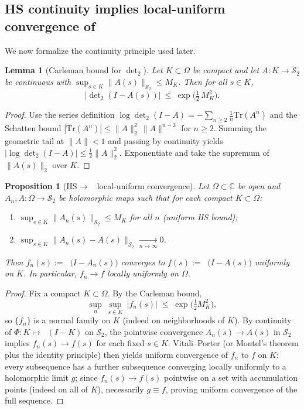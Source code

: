 \documentclass[11pt]{article}
\newtheorem{proposition}[theorem]{Proposition}
\newtheorem{lemma}[theorem]{Lemma}
\theoremstyle{definition}
\theoremstyle{remark}
\newcommand{\C}{\mathbb{C}}
\newcommand{\HS}{\mathcal{S}_2}
\DeclareMathOperator{\dettwo}{det_2}
\begin{document}
\subsection{HS continuity implies local-uniform convergence of \(\dettwo\)}\label{prop:hs-det2-continuity}
We now formalize the continuity principle used later.
\begin{lemma}[Carleman bound for \(\det_2\)]\label{lem:carleman}
Let \(K\subset\Omega\) be compact and let \(A:K\to \HS\) be continuous with \(\sup_{s\in K}\|A(s)\|_{\HS}\le M_K\). Then for all \(s\in K\),
\[
  \big|\det\nolimits_2(I-A(s))\big|\ \le\ \exp\!\Big(\tfrac12\,M_K^2\Big).
\]
\end{lemma}
\begin{proof}
Use the series definition \(\log\det_2(I-A)=-\sum_{n\ge2}\tfrac1n\mathrm{Tr}(A^n)\) and the Schatten bound \(|\mathrm{Tr}(A^n)|\le \|A\|_2^2\,\|A\|^{n-2}\) for \(n\ge 2\). Summing the geometric tail at \(\|A\|<1\) and passing by continuity yields \(|\log\det_2(I-A)|\le \tfrac12\|A\|_2^2\). Exponentiate and take the supremum of \(\|A(s)\|_2\) over \(K\).
\end{proof}
\begin{proposition}[HS\(\to\)\(\dettwo\) local-uniform convergence]\label{prop:HS-to-det2}
Let \(\Omega\subset\C\) be open and \(A_n,A:\Omega\to\HS\) be holomorphic maps such that for each compact \(K\subset\Omega\):
\begin{enumerate}
 \item \(\sup_{s\in K}\|A_n(s)\|_{\HS}\le M_K\) for all \(n\) (uniform HS bound);
 \item \(\sup_{s\in K}\|A_n(s)-A(s)\|_{\HS}\xrightarrow[n\to\infty]{}0\).
\end{enumerate}
Then \(f_n(s):=\dettwo\big(I-A_n(s)\big)\) converges to \(f(s):=\dettwo\big(I-A(s)\big)\) uniformly on \(K\). In particular, \(f_n\to f\) locally uniformly on \(\Omega\).
\end{proposition}
\begin{proof}
Fix a compact \(K\subset\Omega\). By the Carleman bound,
\[
 \sup_{n}\ \sup_{s\in K}\ |f_n(s)|\;\le\; \exp\!\Big(\tfrac12 M_K^2\Big),
\]
so \(\{f_n\}\) is a normal family on \(K\) (indeed on neighborhoods of \(K\)). By continuity of \(\Phi:K\mapsto\dettwo(I-K)\) on \(\HS\), the pointwise convergence \(A_n(s)\to A(s)\) in \(\HS\) implies \(f_n(s)\to f(s)\) for each fixed \(s\in K\). Vitali--Porter (or Montel's theorem plus the identity principle) then yields uniform convergence of \(f_n\) to \(f\) on \(K\): every subsequence has a further subsequence converging locally uniformly to a holomorphic limit \(g\); since \(f_n(s)\to f(s)\) pointwise on a set with accumulation points (indeed on all of \(K\)), necessarily \(g\equiv f\), proving uniform convergence of the full sequence.
\end{proof}
\end{document}
